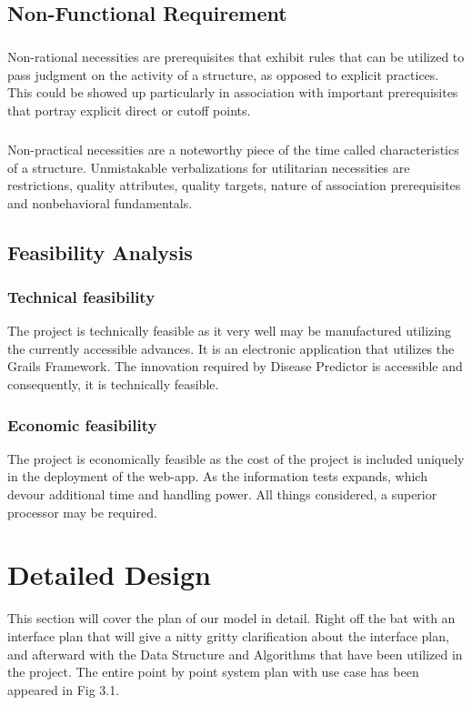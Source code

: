 \documentclass[oneside,12pt]{Classes/VTU}
\begin{document}
    	
    	\section{Non-Functional Requirement}
    	\paragraph{}
    	Non-rational necessities are prerequisites that exhibit rules that can be utilized to pass judgment on the activity of a structure, as opposed to explicit practices. This could be showed up particularly in association with important prerequisites that portray explicit direct or cutoff points. 
    	\paragraph{} 
    	Non-practical necessities are a noteworthy piece of the time called characteristics of a structure. Unmistakable verbalizations for utilitarian necessities are restrictions, quality attributes, quality targets, nature of association prerequisites and nonbehavioral fundamentals.
    	
    	\section{Feasibility Analysis}
    	\subsection{Technical feasibility} 
    	The project is technically feasible as it very well may be manufactured utilizing the currently accessible advances. It is an electronic application that utilizes the Grails Framework. The innovation required by Disease Predictor is accessible and consequently, it is technically feasible.
    	
    	\subsection{Economic feasibility} 
    	The project is economically feasible as the cost of the project is included uniquely in the deployment of the web-app. As the information tests expands, which devour additional time and handling power. All things considered, a superior processor may be required.
    	
    	\chapter{Detailed Design}
    	This section will cover the plan of our model in detail. Right off the bat with an interface plan that will give a nitty gritty clarification about the interface plan, and afterward with the Data Structure and Algorithms that have been utilized in the project. The entire point by point system plan with use case has been appeared in Fig 3.1.
    	
\end{document}
